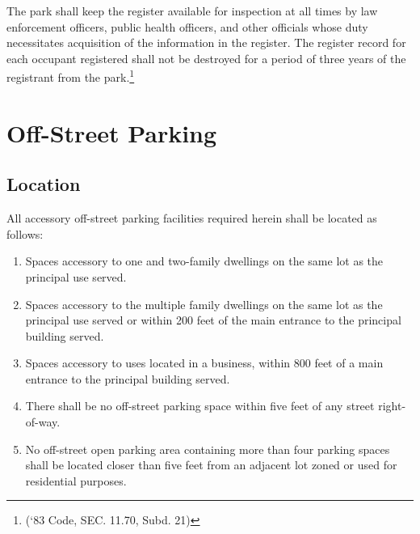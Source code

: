 \subsubsection{}
The park shall keep the register available for inspection at all times by law enforcement officers, public health officers, and other officials whose duty necessitates acquisition of the information in the register. The register record for each occupant registered shall not be destroyed for a period of three years of the registrant from the park.\footnote{(‘83 Code, SEC. 11.70, Subd. 21)}
\section{Off-Street Parking}
\subsection{Location}
All accessory off-street parking facilities required herein shall be located as follows:
\begin{enumerate}[{\indent}1)]
    \item Spaces accessory to one and two-family dwellings on the same lot as the principal use served.
    \item Spaces accessory to the multiple family dwellings on the same lot as the principal use served or within 200 feet of the main entrance to the principal building served.
    \item Spaces accessory to uses located in a business, within 800 feet of a main entrance to the principal building served.
    \item There shall be no off-street parking space within five feet of any street right-of-way.
    \item No off-street open parking area containing more than four parking spaces shall be located closer than five feet from an adjacent lot zoned or used for residential purposes.
\end{enumerate}
